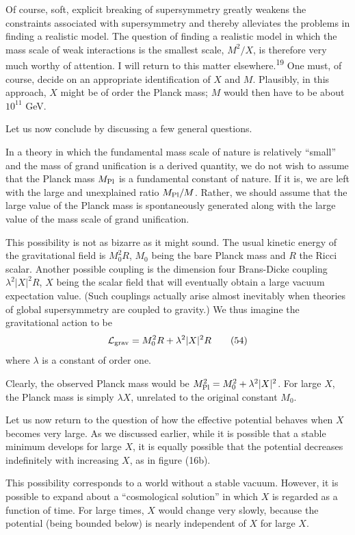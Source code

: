 Of course, soft, explicit breaking of supersymmetry greatly
weakens the constraints associated with supersymmetry and thereby
alleviates the problems in finding a realistic model. The question
of finding a realistic model in which the mass scale of weak interactions
is the smallest scale, $M^2/X$, is therefore very much worthy
of attention. I will return to this matter elsewhere.\textsuperscript{19} One must,
of course, decide on an appropriate identification of $X$ and $M$.
Plausibly, in this approach, $X$ might be of order the Planck mass;
$M$ would then have to be about $10^{11}$ GeV.

Let us now conclude by discussing a few general questions.

In a theory in which the fundamental mass scale of nature is
relatively ``small'' and the mass of grand unification is a derived
quantity, we do not wish to assume that the Planck mass $M_{\rm Pl}$ is a
fundamental constant of nature. If it is, we are left with the large
and unexplained ratio $M_{\rm Pl}/M$. Rather, we should assume that the large
value of the Planck mass is spontaneously generated along with the
large value of the mass scale of grand unification.

This possibility is not as bizarre as it might sound. The
usual kinetic energy of the gravitational field is $M_0^2 R$, $M_0$ being
the bare Planck mass and $R$ the Ricci scalar. Another possible
coupling is the dimension four Brans-Dicke coupling $\lambda^2 |X|^2 R$, $X$ being the
scalar field that will eventually obtain a large vacuum expectation
value. (Such couplings actually arise almost inevitably when theories
of global supersymmetry are coupled to gravity.) We thus
imagine the gravitational action to be
\begin{equation}
\mathcal{L}_{\rm grav} = M_0^2 R + \lambda^2 |X|^2 R
\tag{54}
\end{equation}
where $\lambda$ is a constant of order one.

Clearly, the observed Planck mass would be $M_{\rm Pl}^2 = M_0^2 + \lambda^2 |X|^2$.
For large $X$, the Planck mass is simply $\lambda X$, unrelated to the original
constant $M_0$.

Let us now return to the question of how the effective potential
behaves when $X$ becomes very large. As we discussed earlier, while it
is possible that a stable minimum develops for large $X$, it is equally
possible that the potential decreases indefinitely with increasing $X$,
as in figure (16b).

This possibility corresponds to a world without a stable vacuum.
However, it is possible to expand about a ``cosmological solution'' in
which $X$ is regarded as a function of time. For large times, $X$ would
change very slowly, because the potential (being bounded below) is
nearly independent of $X$ for large $X$.

